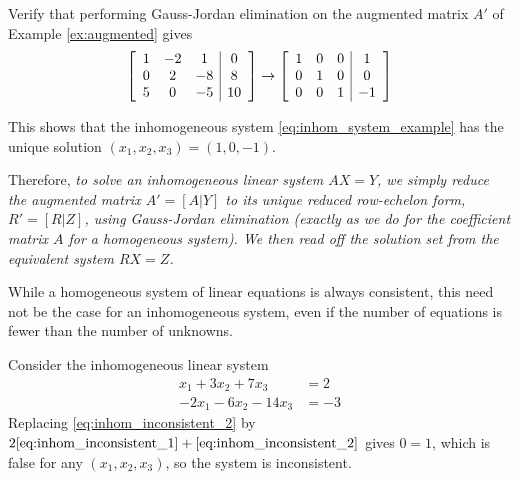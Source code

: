 \documentclass[12pt,letterpaper,reqno]{article}
\numberwithin{equation}{section}
\newcommand{\ti}[1]{\textit{#1}}
\begin{document}
\begin{exercise}
Verify that performing Gauss-Jordan elimination on the augmented matrix $A'$ of Example \ref{ex:augmented} gives
\begin{align*}
	\left[\begin{array}{c c c | c}
		1&-2&1&0 \\
		0&2&-8&8 \\
		5&0&-5&10
	\end{array}\right] \to \left[\begin{array}{c c c | c}
		1&0&0&1 \\
		0&1&0&0 \\
		0&0&1&-1
	\end{array}\right]
\end{align*}
	
This shows that the inhomogeneous system \eqref{eq:inhom_system_example} has the unique solution $(x_1,x_2,x_3)=(1,0,-1)$.
\end{exercise}


Therefore, \ti{to solve an inhomogeneous linear system $AX=Y$, we simply reduce the augmented matrix $A'=[A|Y]$ to its unique reduced row-echelon form, $R'=[R|Z]$, using Gauss-Jordan elimination (exactly as we do for the coefficient matrix $A$ for a homogeneous system). We then read off the solution set from the equivalent system $RX=Z$.}

While a homogeneous system of linear equations is always consistent, this need not be the case for an inhomogeneous system, even if the number of equations is fewer than the number of unknowns.

\begin{example}
Consider the inhomogeneous linear system
	\begin{align}
		x_1+3x_2+7x_3&=2 \label{eq:inhom_inconsistent_1} \\
		-2x_1-6x_2-14x_3&=-3 \label{eq:inhom_inconsistent_2}
	\end{align}
Replacing \eqref{eq:inhom_inconsistent_2} by $2\eqref{eq:inhom_inconsistent_1}+\eqref{eq:inhom_inconsistent_2}$ gives $0=1$, which is false for any $(x_1,x_2,x_3)$, so the system is inconsistent.
\end{example}
\end{document}
